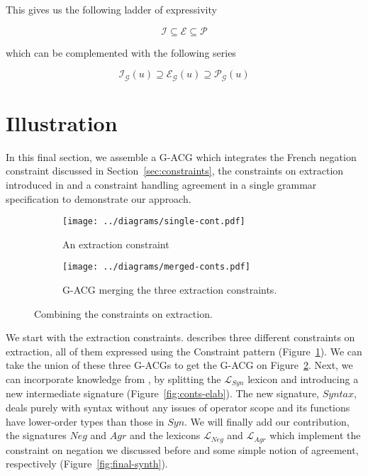 \documentclass{llncs}
\begin{document}
This gives us the following ladder of expressivity

$$
\mathcal{I} \subseteq \mathcal{E} \subseteq \mathcal{P}
$$

which can be complemented with the following series

$$
\mathcal{I}_{\mathcal{G}}(u) \supseteq \mathcal{E}_{\mathcal{G}}(u) \supseteq
\mathcal{P}_{\mathcal{G}}(u)
$$


\section{Illustration}

In this final section, we assemble a G-ACG which integrates the French
negation constraint discussed in Section~\ref{sec:constraints}, the
constraints on extraction introduced in \cite{pogodalla2012controlling} and a
constraint handling agreement in a single grammar specification to demonstrate
our approach.

\begin{figure}[t]
  \centering
  \begin{subfigure}[b]{0.4\textwidth}
    \centering
    \texttt{[image: ../diagrams/single-cont.pdf]}
    \caption{\label{fig:single-cont} An extraction constraint }
  \end{subfigure}
  \qquad
  \begin{subfigure}[b]{0.4\textwidth}
    \centering
    \texttt{[image: ../diagrams/merged-conts.pdf]}
    \caption{\label{fig:merged-conts} G-ACG merging the three extraction
      constraints.}
  \end{subfigure}
  \caption{\label{fig:conts} Combining the constraints on extraction.}
\end{figure}

We start with the extraction constraints. \cite{pogodalla2012controlling}
describes three different constraints on extraction, all of them expressed
using the Constraint pattern (Figure~\ref{fig:single-cont}). We can take the
union of these three G-ACGs to get the G-ACG on Figure~\ref{fig:merged-conts}.
Next, we can incorporate knowledge from \cite{pogodalla2007generalizing}, by
splitting the $\mathcal{L}_{Syn}$ lexicon and introducing a new intermediate
signature (Figure~\ref{fig:conts-elab}). The new signature, $Syntax$, deals
purely with syntax without any issues of operator scope and its functions have
lower-order types than those in $Syn$. We will finally add our contribution,
the signatures $Neg$ and $Agr$ and the lexicons $\mathcal{L}_{Neg}$ and
$\mathcal{L}_{Agr}$ which implement the constraint on negation we discussed
before and some simple notion of agreement, respectively
(Figure~\ref{fig:final-synth}).
\end{document}
